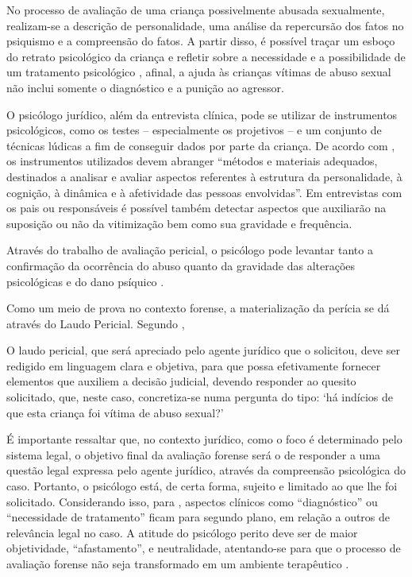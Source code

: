 No processo de avaliação de uma criança possivelmente abusada sexualmente, realizam-se a descrição de personalidade, uma análise da repercursão dos fatos no psiquismo e a compreensão do fatos. A partir disso, é possível traçar um esboço do retrato psicológico da criança e refletir sobre a necessidade e a possibilidade de um tratamento psicológico , afinal, a ajuda às crianças vítimas de abuso sexual não inclui somente o diagnóstico e a punição ao agressor. 

O psicólogo jurídico, além da entrevista clínica, pode se utilizar de instrumentos psicológicos, como os testes -- especialmente os projetivos -- e um conjunto de técnicas lúdicas a fim de conseguir dados por parte da criança. De acordo com , os instrumentos utilizados devem abranger ``métodos e materiais adequados, destinados a analisar e avaliar aspectos referentes à estrutura da personalidade, à cognição, à dinâmica e à afetividade das pessoas envolvidas''. Em entrevistas com os pais ou responsáveis é possível também detectar aspectos que auxiliarão na suposição ou não da vitimização bem como sua gravidade e frequência. 

Através do trabalho de avaliação pericial, o psicólogo pode levantar tanto a confirmação da ocorrência do abuso quanto da gravidade das alterações psicológicas e do dano psíquico \cite{JUNG2006}. 

Como um meio de prova no contexto forense, a materialização da perícia se dá através do Laudo Pericial. Segundo ,

\begin{citacao}
	O laudo pericial, que será apreciado pelo agente jurídico que o solicitou, deve ser redigido em linguagem clara e objetiva, para que possa efetivamente fornecer elementos que auxiliem a decisão judicial, devendo responder ao quesito solicitado, que, neste caso, concretiza-se numa pergunta do tipo: `há indícios de que esta criança foi vítima de abuso sexual?'
\end{citacao}

É importante ressaltar que, no contexto jurídico, como o foco é determinado pelo sistema legal, o objetivo final da avaliação forense será o de responder a uma questão legal expressa pelo agente jurídico, através da compreensão psicológica do caso. Portanto, o psicólogo está, de certa forma, sujeito e limitado ao que lhe foi solicitado. Considerando isso, para , aspectos clínicos como ``diagnóstico'' ou ``necessidade de tratamento'' ficam para segundo plano, em relação a outros de relevância legal no caso. A atitude do psicólogo perito deve ser de maior objetividade, ``afastamento'', e neutralidade, atentando-se para que o processo de avaliação forense não seja transformado em um ambiente terapêutico \cite[p. 44]{ROVINSKI2004}.
	
